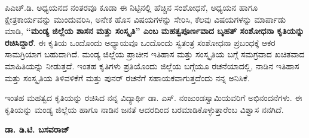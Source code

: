 ಪಿಎಚ್​.ಡಿ. ಅಧ್ಯಯನದ ನಂತರವೂ ಕೂಡಾ ಈ ನಿಟ್ಟಿನಲ್ಲಿ ಹೆಚ್ಚಿನ ಸಂಶೋಧನೆ, ಅಧ್ಯಯನ ಹಾಗೂ ಕ್ಷೇತ್ರ\-ಕಾರ್ಯವನ್ನು  ಮುಂದುವರಿಸಿ,  ಅನೇಕ ಹೊಸ ವಿಷಯಗಳನ್ನು ಸೇರಿಸಿ, ಕೆಲವು ವಿಷಯಗಳನ್ನು ಮಾರ್ಪಾಡು ಮಾಡಿ, \textbf{“ಮಂಡ್ಯ ಜಿಲ್ಲೆಯ ಶಾಸನ ಮತ್ತು ಸಂಸ್ಕೃತಿ” ಎಂಬ ಮಹತ್ವಪೂರ್ಣವಾದ ಬೃಹತ್​ ಸಂಶೋಧನಾ ಕೃತಿಯನ್ನು ರಚಿಸಿದ್ದಾರೆ}. ಈ ಕೃತಿಯ ಒಂದೊಂದು ಅಧ್ಯಾಯವೂ ಒಂದೊಂದು ಸ್ವತಂತ್ರ ಸಂಶೋಧನಾ ಪ್ರಬಂಧಕ್ಕೆ ಆಕರ ಸಾಮಗ್ರಿಯಾಗ ಬಹುದಾಗಿದೆ.  ಮಂಡ್ಯ ಜಿಲ್ಲೆಯ ಪ್ರಾಚೀನ ಇತಿಹಾಸ ಮತ್ತು ಸಂಸ್ಕೃತಿಯ ಬಗ್ಗೆ ಸಮಗ್ರವಾದ ಖಚಿತವಾದ ಮಾಹಿತಿಯನ್ನು ನೀಡುತ್ತದೆ. ಇಂತಹ ಕೃತಿಗಳು ಪ್ರತಿಯೊಂದು ಜಿಲ್ಲೆಯ ಬಗ್ಗೆಯೂ ರಚನೆಯಾದಲ್ಲಿ, ನಾಡಿನ ಇತಿಹಾಸ ಮತ್ತು ಸಂಸ್ಕೃತಿಯ  ತಿಳಿವಳಿಕೆಗೆ ಮತ್ತು ಪುನರ್​ ರಚನೆಗೆ ಸಹಾಯಕವಾಗುತ್ತದೆಂದು ನನ್ನ ಅನಿಸಿಕೆ. 

ಇಂತಹ ಮಹತ್ವದ ಕೃತಿಯನ್ನು ರಚಿಸಿದ ನನ್ನ ವಿದ್ಯಾರ್ಥಿ ಡಾ. ಎಸ್​. ನಂಜುಂಡಸ್ವಾಮಿಯವರಿಗೆ ಅಭಿನಂದನೆಗಳು.  ಈ ಕೃತಿಯನ್ನು ಮಂಡ್ಯ ಜಿಲ್ಲೆಯ ಹಾಗೂ ನಾಡಿನ ಜನತೆ ಆದರದಿಂದ ಬರಮಾಡಿಕೊಳ್ಳುತ್ತಾರೆಂಬ ವಿಶ್ವಾಸ ನನಗಿದೆ. 


\medskip
\bigskip

\noindent
\hfill \textbf{ಡಾ. ಡಿ.ಟಿ. ಬಸವರಾಜ್}

